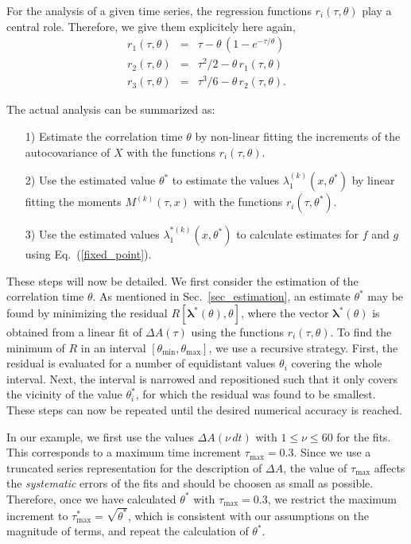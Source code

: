 \documentclass[aps,twocolumn,superscriptaddress,showpacs,showkeys]{revtex4}
\newcommand{\veclambda}{{\boldsymbol{\lambda}}}
\begin{document}
For the analysis of a given time series, the regression functions $r_i(\tau,\theta)$ play a central role. Therefore,
we give them explicitely here again,
%
\begin{subequations}\label{def2_r_i}
\begin{eqnarray}
r_1(\tau,\theta) &=& \tau - \theta\, (1-e^{-\tau/\theta})\\
r_2(\tau,\theta) &=& \tau^2/2 - \theta\, r_1(\tau,\theta)\\
r_3(\tau,\theta) &=& \tau^3/6 - \theta\, r_2(\tau,\theta).
\end{eqnarray}
\end{subequations}

\noindent The actual analysis can be summarized as:
\begin{itemize}
\item[1)] Estimate the correlation time $\theta$ by non-linear fitting the increments of the autocovariance
of $X$ with the functions $r_i(\tau,\theta)$.
\item[2)] Use the estimated value $\theta^*$ to estimate the values $\lambda_1^{(k)}(x,\theta^*)$ by linear fitting
the moments $M^{(k)}(\tau,x)$ with the functions $r_i(\tau,\theta^*)$.
\item[3)] Use the estimated values $\lambda_1^{*(k)}(x,\theta^*)$ to calculate estimates for $f$ and $g$ using
Eq.~(\ref{fixed_point}).
\end{itemize}

\noindent These steps will now be detailed. We first consider the estimation of the correlation time $\theta$.
As mentioned in Sec.~\ref{sec_estimation}, an estimate $\theta^*$
may be found by minimizing the residual $R[\veclambda^*(\theta),\theta]$, where the vector $\veclambda^*(\theta)$ is
obtained from a linear fit of $\Delta A(\tau)$ using the functions $r_i(\tau,\theta)$.
To find the minimum of $R$ in an interval $[\theta_\text{min},\theta_\text{max}]$, we use a recursive strategy.
First, the residual is evaluated for a number of equidistant values $\theta_i$ covering the whole interval.
Next, the interval is narrowed and repositioned such that it only covers the vicinity of the value $\theta_i^*$, for
which the residual was found to be smallest. These steps can now be repeated until the desired numerical accuracy
is reached.

In our example, we first use the values $\Delta A(\nu\, dt)$ with $1\le\nu\le 60$ for the fits. This corresponds to a maximum
time increment $\tau_\text{max}=0.3$. Since we use a truncated series representation for the description of $\Delta A$,
the value of $\tau_\text{max}$ affects the {\em systematic} errors of the fits and should be choosen as small as possible.
Therefore, once we have calculated $\theta^*$ with $\tau_\text{max}=0.3$, we restrict the maximum increment to
$\tau^*_\text{max}=\sqrt{\theta^*}$, which is consistent with our assumptions on the magnitude of terms, and repeat the
calculation of $\theta^*$.
\end{document}
